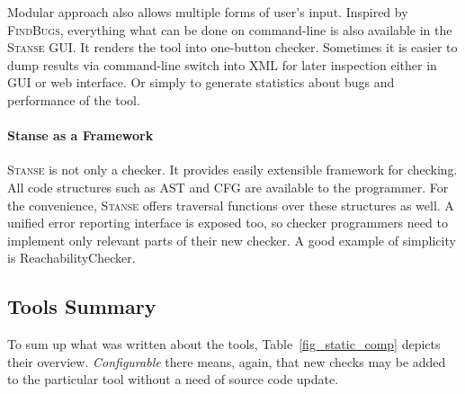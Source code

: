 \documentclass[11pt,a4paper]{article}
\newcommand{\stan}{\textsc{Stanse}\xspace}
\begin{document}
Modular approach also allows multiple forms of user's input. Inspired by
\textsc{FindBugs}, everything what can be done on command-line is also
available in the \stan GUI. It renders the tool into one-button checker.
Sometimes it is easier to dump results via command-line switch into XML for
later inspection either in GUI or web interface. Or simply to generate
statistics about bugs and performance of the tool.

\paragraph{Stanse as a Framework} \stan is not only a checker. It provides
easily extensible framework for checking. All code structures such as AST and
CFG are available to the programmer. For the convenience, \stan offers
traversal functions over these structures as well. A unified error reporting
interface is exposed too, so checker programmers need to implement only
relevant parts of their new checker. A good example of simplicity is
ReachabilityChecker.

\subsection{Tools Summary}
To sum up what was written about the tools, Table~\ref{fig_static_comp}
depicts their overview. \emph{Configurable} there means, again, that new
checks may be added to the particular tool without a need of source code
update.
\end{document}
